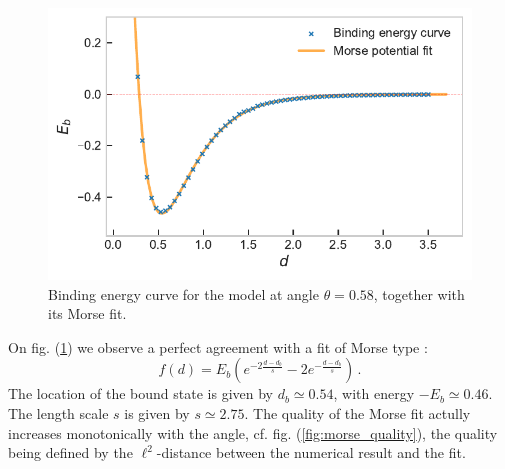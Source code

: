 \documentclass[reprint, amsmath, amssymb, floatfix, aps, pra]{revtex4-2}
\begin{document}
    \begin{figure}
        \includegraphics[scale=0.74]{figures/binding.pdf}
        \caption{\label{fig:binding}Binding energy curve for the model at angle $\theta=0.58$, together with its Morse fit.}
    \end{figure}

    On fig. (\ref{fig:binding}) we observe a perfect agreement with a fit of Morse type \cite{herzberg1950spectra, apanavicius2021morse, le2006accurate, roy2007new, chiumorse2010}:
    \begin{equation}
    \label{eq:morse_fit}
        f(d) = E_b\left(e^{-2\frac{d-d_b}{s}} - 2e^{-\frac{d-d_b}{s}}\right)\,.
    \end{equation}
    The location of the bound state is given by $d_b\simeq 0.54$, with energy $-E_b\simeq 0.46$. The length scale $s$ is given by $s\simeq 2.75$. The quality of the Morse fit actully increases monotonically with the angle, cf. fig. (\ref{fig:morse_quality}), the quality being defined by the $\ell^2$-distance between the numerical result and the fit.
\end{document}

